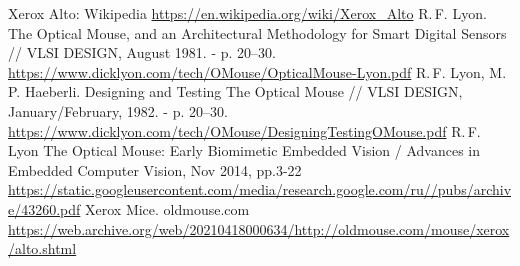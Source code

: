 \documentclass[11pt, a4paper]{article}
\begin{document}
\begin{thebibliography}{9}
 Xerox Alto: Wikipedia \url{https://en.wikipedia.org/wiki/Xerox_Alto}
 R.\,F. Lyon. The Optical Mouse, and an Architectural Methodology for
Smart Digital Sensors // VLSI DESIGN, August 1981. - p. 20--30. \url{https://www.dicklyon.com/tech/OMouse/OpticalMouse-Lyon.pdf}
 R.\,F. Lyon, M.\,P. Haeberli. Designing and Testing The Optical Mouse // VLSI DESIGN, January/February, 1982. - p. 20--30. \url{https://www.dicklyon.com/tech/OMouse/DesigningTestingOMouse.pdf}
 R.\,F. Lyon The Optical Mouse: Early Biomimetic Embedded Vision / Advances in Embedded Computer Vision, Nov 2014, pp.3-22 \url{https://static.googleusercontent.com/media/research.google.com/ru//pubs/archive/43260.pdf}
 Xerox Mice. oldmouse.com \url{https://web.archive.org/web/20210418000634/http://oldmouse.com/mouse/xerox/alto.shtml}
\end{thebibliography}
\end{document}
